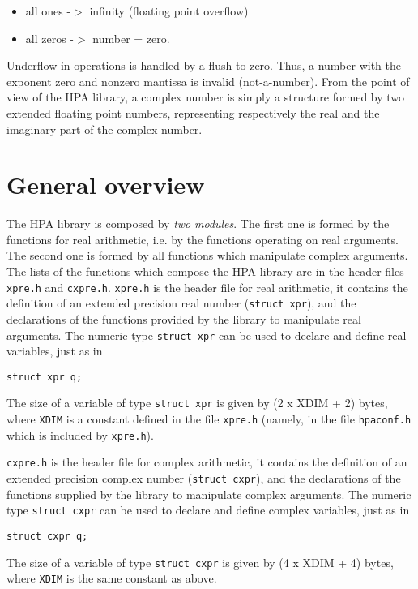 \documentclass{article}
\begin{document}
\begin{itemize}
\item all ones -$>$ infinity (floating point overflow)
\item all zeros -$>$ number = zero.
\end{itemize}

Underflow in operations is handled by a flush to zero. Thus, a number with
the exponent zero and nonzero mantissa is invalid (not-a-number).
From the point of view of the HPA library, a complex number is simply
a structure formed by two extended floating point numbers, representing
respectively the real and the imaginary part of the complex number.


\hypertarget{toc4}{}
\section{General overview}
The HPA library is composed by \textit{two} \textit{modules}. The first one is formed
by the functions for real arithmetic, i.e. by the functions
operating on real arguments. The second one is formed by all functions
which manipulate complex arguments.
The lists of the functions which compose the HPA library
are in the header files \texttt{xpre.h} and \texttt{cxpre.h}.
\texttt{xpre.h} is the header file for real arithmetic, it contains the definition
of an extended precision real number (\texttt{struct xpr}),
and the declarations of the functions provided by the library
to manipulate real arguments.
The numeric type \texttt{struct xpr} can be used to declare and define
real variables, just as in

\begin{verbatim}
struct xpr q;
\end{verbatim}
The size of a variable of type \texttt{struct xpr} is given by  
(2 x XDIM + 2) bytes, where  \texttt{XDIM} is a constant defined in the file 
\texttt{xpre.h} (namely, in the file \texttt{hpaconf.h} which is included by 
\texttt{xpre.h}).

\texttt{cxpre.h} is the header file for complex arithmetic, it contains 
the definition of an extended precision complex number 
(\texttt{struct cxpr}), and the declarations of the functions supplied
by the library to manipulate complex arguments.
The numeric type \texttt{struct cxpr} can be used to declare and define
complex variables, just as in

\begin{verbatim}
struct cxpr q;
\end{verbatim}
The size of a variable of type \texttt{struct cxpr} is given by  
(4 x XDIM + 4) bytes, where  \texttt{XDIM} is the same constant as above.
\end{document}
